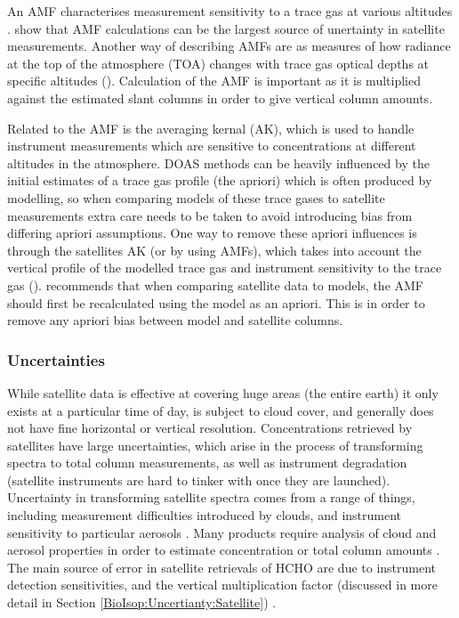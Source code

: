       An AMF characterises measurement sensitivity to a trace gas at various altitudes \cite[e.g.]{Palmer2001}.
      \cite{Lorente2017} show that AMF calculations can be the largest source of unertainty in satellite measurements.
      Another way of describing AMFs are as measures of how radiance at the top of the atmosphere (TOA) changes with trace gas optical depths at specific altitudes (\cite{Lorente2017}).
      Calculation of the AMF is important as it is multiplied against the estimated slant columns in order to give vertical column amounts.
      
      Related to the AMF is the averaging kernal (AK), which is used to handle instrument measurements which are sensitive to concentrations at different altitudes in the atmosphere.
      DOAS methods can be heavily influenced by the initial estimates of a trace gas profile (the apriori) which is often produced by modelling, so when comparing models of these trace gases to satellite measurements extra care needs to be taken to avoid introducing bias from differing apriori assumptions.
      One way to remove these apriori influences is through the satellites AK (or by using AMFs), which takes into account the vertical profile of the modelled trace gas and instrument sensitivity to the trace gas (\cite{Eskes2003, Palmer2001}).
      \cite{Lamsal2014} recommends that when comparing satellite data to models, the AMF should first be recalculated using the model as an apriori.
      This is in order to remove any apriori bias between model and satellite columns.
      
    \subsubsection{Uncertainties}
      While satellite data is effective at covering huge areas (the entire earth) it only exists at a particular time of day, is subject to cloud cover, and generally does not have fine horizontal or vertical resolution.
      Concentrations retrieved by satellites have large uncertainties, which arise in the process of transforming spectra to total column measurements, as well as instrument degradation (satellite instruments are hard to tinker with once they are launched).
      Uncertainty in transforming satellite spectra comes from a range of things, including measurement difficulties introduced by clouds, and instrument sensitivity to particular aerosols \citep{Millet2006}.
      Many products require analysis of cloud and aerosol properties in order to estimate concentration or total column amounts \citep{Palmer2001,Palmer2003, Marais2012, Vasilkov2017}.
      The main source of error in satellite retrievals of HCHO are due to instrument detection sensitivities, and the vertical multiplication factor (discussed in more detail in Section \ref{BioIsop:Uncertianty:Satellite}) \citep{Millet2006}.
      

